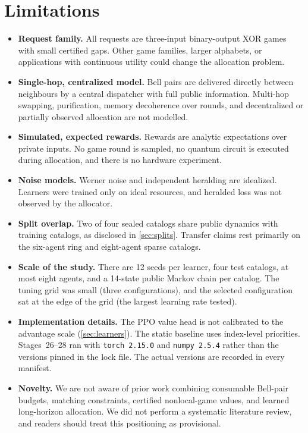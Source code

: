\documentclass[11pt,a4paper]{article}
\begin{document}
\section{Limitations}\label{sec:limitations}

\begin{itemize}[leftmargin=*]
  \item \textbf{Request family.} All requests are three-input binary-output XOR games with small certified gaps. Other game families, larger alphabets, or applications with continuous utility could change the allocation problem.
  \item \textbf{Single-hop, centralized model.} Bell pairs are delivered directly between neighbours by a central dispatcher with full public information. Multi-hop swapping, purification, memory decoherence over rounds, and decentralized or partially observed allocation are not modelled.
  \item \textbf{Simulated, expected rewards.} Rewards are analytic expectations over private inputs. No game round is sampled, no quantum circuit is executed during allocation, and there is no hardware experiment.
  \item \textbf{Noise models.} Werner noise and independent heralding are idealized. Learners were trained only on ideal resources, and heralded loss was not observed by the allocator.
  \item \textbf{Split overlap.} Two of four sealed catalogs share public dynamics with training catalogs, as disclosed in \cref{sec:splits}. Transfer claims rest primarily on the six-agent ring and eight-agent sparse catalogs.
  \item \textbf{Scale of the study.} There are 12 seeds per learner, four test catalogs, at most eight agents, and a 14-state public Markov chain per catalog. The tuning grid was small (three configurations), and the selected configuration sat at the edge of the grid (the largest learning rate tested).
  \item \textbf{Implementation details.} The PPO value head is not calibrated to the advantage scale (\cref{sec:learners}). The static baseline uses index-level priorities. Stages~26--28 ran with \texttt{torch 2.15.0} and \texttt{numpy 2.5.4} rather than the versions pinned in the lock file. The actual versions are recorded in every manifest.
  \item \textbf{Novelty.} We are not aware of prior work combining consumable Bell-pair budgets, matching constraints, certified nonlocal-game values, and learned long-horizon allocation. We did not perform a systematic literature review, and readers should treat this positioning as provisional.
\end{itemize}
\end{document}
